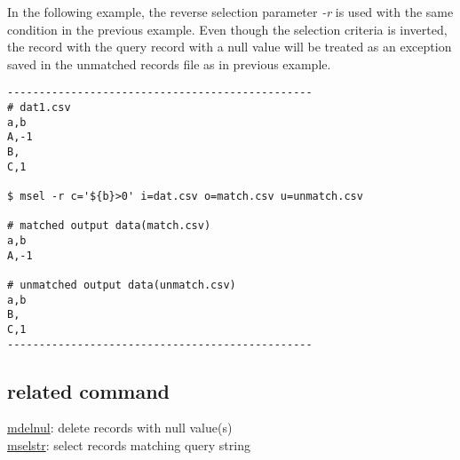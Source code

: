 \documentclass[a4paper]{jarticle}
\begin{document}
In the following example, the reverse selection parameter \emph{-r} is used with the same condition in the previous example. Even though the selection criteria is inverted, the record with the query record with a null value will be treated as an exception saved in the unmatched records file as in previous example. 

\begin{verbatim}
------------------------------------------------
# dat1.csv
a,b
A,-1
B,
C,1

$ msel -r c='${b}>0' i=dat.csv o=match.csv u=unmatch.csv

# matched output data(match.csv)
a,b
A,-1

# unmatched output data(unmatch.csv)
a,b
B,
C,1
------------------------------------------------
\end{verbatim}

\subsection*{related command}
\noindent
\href{run:mdelnul.pdf}{mdelnul}: delete records with null value(s)\\
\href{run:mselstr.pdf}{mselstr}: select records matching query string
\end{document}
